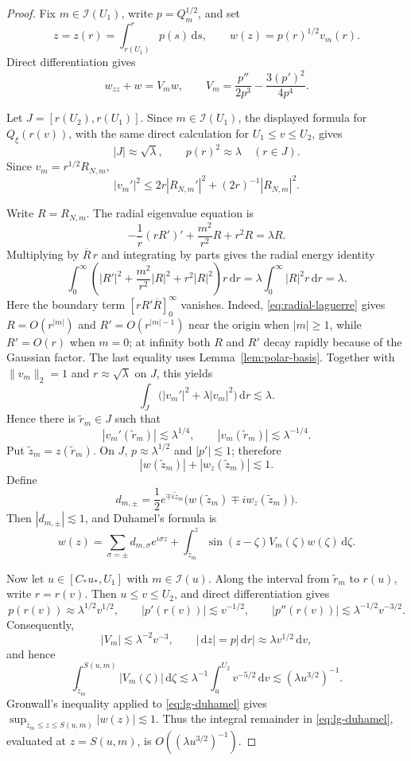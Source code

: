 \documentclass[10pt,a4paper]{amsart}
\numberwithin{equation}{section}
\newcommand{\dd}{\,\mathrm d}
\newcommand{\norm}[1]{\lVert #1\rVert}
\begin{document}
\begin{proof}
Fix \(m\in\mathcal I(U_1)\), write \(p=Q_m^{1/2}\), and set
\[
 z=z(r)=\int_{r(U_1)}^r p(s)\dd s,
 \qquad
 w(z)=p(r)^{1/2}v_m(r).
\]
Direct differentiation gives
\[
 w_{zz}+w=V_mw,
 \qquad
 V_m=\frac{p''}{2p^3}-\frac{3(p')^2}{4p^4}.
\]

Let \(J=[r(U_2),r(U_1)]\). Since \(m\in\mathcal I(U_1)\), the displayed formula for
\(Q_\xi(r(v))\), with the same direct calculation for
\(U_1\le v\le U_2\), gives
\[
 |J|\approx\sqrt\lambda,
 \qquad p(r)^2\approx\lambda\quad(r\in J).
\]
Since \(v_m=r^{1/2}R_{N,m}\),
\[
 |v_m'|^2\le2r|R_{N,m}'|^2+(2r)^{-1}|R_{N,m}|^2.
\]

 Write \(R=R_{N,m}\).
The radial eigenvalue equation is
\[
 -\frac1r(rR')'+\frac{m^2}{r^2}R+r^2R=\lambda R.
\]
Multiplying by \(\overline R\,r\) and integrating by parts gives the radial energy identity
\[
 \int_0^\infty\left(|R'|^2+\frac{m^2}{r^2}|R|^2
 +r^2|R|^2\right)r\dd r
 =\lambda\int_0^\infty|R|^2r\dd r=\lambda.
\]
Here the boundary term \([rR'\overline R]_0^\infty\) vanishes. Indeed,
\eqref{eq:radial-laguerre} gives \(R=O(r^{|m|})\) and
\(R'=O(r^{|m|-1})\) near the origin when \(|m|\ge1\), while
\(R'=O(r)\) when \(m=0\); at infinity both \(R\) and \(R'\) decay
rapidly because of the Gaussian factor. The last equality uses
Lemma~\ref{lem:polar-basis}.
Together with \(\norm{v_m}_2=1\) and \(r\approx\sqrt\lambda\) on \(J\),
this yields
\[
 \int_J\bigl(|v_m'|^2+\lambda|v_m|^2\bigr)\dd r\lesssim\lambda.
\]
Hence there is \(\tilde r_m\in J\) such that
\[
 |v_m'(\tilde r_m)|\lesssim\lambda^{1/4},
 \qquad |v_m(\tilde r_m)|\lesssim\lambda^{-1/4}.
\]
Put \(\tilde z_m=z(\tilde r_m)\). On \(J\),
\(p\approx\lambda^{1/2}\) and \(|p'|\lesssim1\); therefore
\[
 |w(\tilde z_m)|+|w_z(\tilde z_m)|\lesssim1.
\]
Define
\[
 d_{m,\pm}=\frac12e^{\mp i\tilde z_m}
 \bigl(w(\tilde z_m)\mp iw_z(\tilde z_m)\bigr).
\]
Then \(|d_{m,\pm}|\lesssim1\), and Duhamel's formula is
\begin{equation}\label{eq:lg-duhamel}
 w(z)=\sum_{\sigma=\pm}d_{m,\sigma}e^{i\sigma z}
 +\int_{\tilde z_m}^z\sin(z-\zeta)V_m(\zeta)w(\zeta)\dd\zeta.
\end{equation}

Now let \(u\in[C_*u_*,U_1]\) with \(m\in\mathcal I(u)\).
Along the interval from \(\tilde r_m\) to \(r(u)\), write \(r=r(v)\).
Then \(u\le v\le U_2\), and direct differentiation gives
\[
 p(r(v))\approx\lambda^{1/2}v^{1/2},
 \qquad |p'(r(v))|\lesssim v^{-1/2},
 \qquad |p''(r(v))|\lesssim\lambda^{-1/2}v^{-3/2}.
\]
Consequently,
\[
 |V_m|\lesssim\lambda^{-2}v^{-3},
 \qquad |\dd z|=p|\dd r|\approx\lambda v^{1/2}\dd v,
\]
and hence
\[
 \int_{\tilde z_m}^{S(u,m)}|V_m(\zeta)|\dd\zeta
 \lesssim\lambda^{-1}\int_u^{U_2}v^{-5/2}\dd v
 \lesssim(\lambda u^{3/2})^{-1}.
\]
Gronwall's inequality applied to \eqref{eq:lg-duhamel} gives
\(\sup_{\tilde z_m\le z\le S(u,m)}|w(z)|\lesssim1\). Thus the integral
remainder in \eqref{eq:lg-duhamel}, evaluated at \(z=S(u,m)\), is
\(O((\lambda u^{3/2})^{-1})\).


\end{proof}
\end{document}
